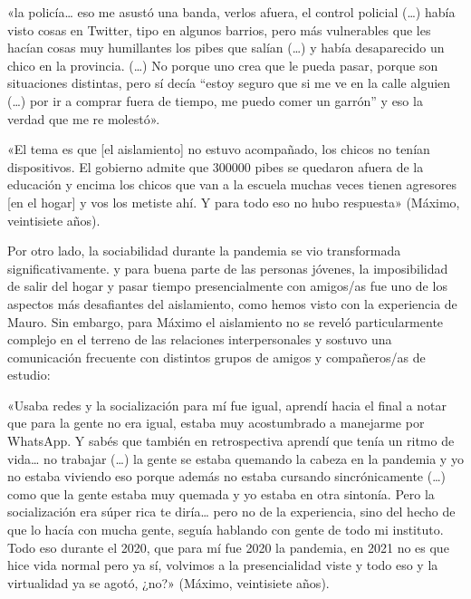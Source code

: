 \begin{refsection}
\begin{gbcita}
«la policía… eso me asustó una banda, verlos afuera, el control policial (…) había visto cosas en Twitter, tipo en algunos barrios, pero más vulnerables que les hacían cosas muy humillantes los pibes que salían (…) y había desaparecido un chico en la provincia. (…) No porque uno crea que le pueda pasar, porque son situaciones distintas, pero sí decía “estoy seguro que si me ve en la calle alguien (…) por ir a comprar fuera de tiempo, me puedo comer un garrón” y eso la verdad que me re molestó».

«El tema es que [el aislamiento] no estuvo acompañado, los chicos no tenían dispositivos. El gobierno admite que \num{300000} pibes se quedaron afuera de la educación y encima los chicos que van a la escuela muchas veces tienen agresores [en el hogar] y vos los metiste ahí. Y para todo eso no hubo respuesta» (Máximo, veintisiete años).

\end{gbcita}

Por otro lado, la sociabilidad durante la pandemia se vio transformada significativamente. y para buena parte de las personas jóvenes, la imposibilidad de salir del hogar y pasar tiempo presencialmente con amigos/as fue uno de los aspectos más desafiantes del aislamiento, como hemos visto con la experiencia de Mauro. Sin embargo, para Máximo el aislamiento no se reveló particularmente complejo en el terreno de las relaciones interpersonales y sostuvo una comunicación frecuente con distintos grupos de amigos y compañeros/as de estudio:


\begin{gbcita}
«Usaba redes y la socialización para mí fue igual, aprendí hacia el final a notar que para la gente no era igual, estaba muy acostumbrado a manejarme por WhatsApp. Y sabés que también en retrospectiva aprendí que tenía un ritmo de vida… no trabajar (…) la gente se estaba quemando la cabeza en la pandemia y yo no estaba viviendo eso porque además no estaba cursando sincrónicamente (…) como que la gente estaba muy quemada y yo estaba en otra sintonía. Pero la socialización era súper rica te diría… pero no de la experiencia, sino del hecho de que lo hacía con mucha gente, seguía hablando con gente de todo mi instituto. Todo eso durante el 2020, que para mí fue 2020 la pandemia, en 2021 no es que hice vida normal pero ya sí, volvimos a la presencialidad viste y todo eso y la virtualidad ya se agotó, ¿no?» (Máximo, veintisiete años).

\end{gbcita}


\end{refsection}

